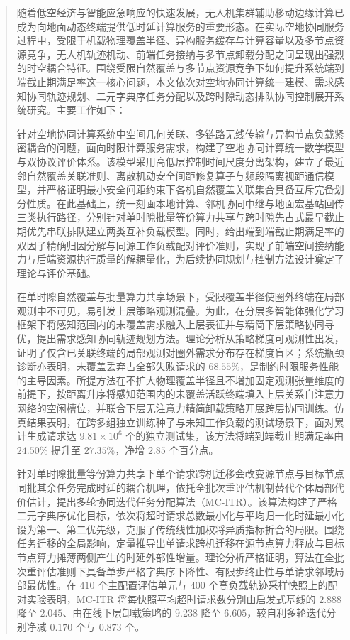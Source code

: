 
\begin{abstract}
随着低空经济与智能应急响应的快速发展，无人机集群辅助移动边缘计算已成为向地面动态终端提供低时延计算服务的重要形态。在实际空地协同服务过程中，受限于机载物理覆盖半径、异构服务缓存与计算容量以及多节点资源竞争，无人机轨迹机动、前端任务接纳与多节点卸载分配之间呈现出强烈的时空耦合特征。围绕受限自然覆盖与多节点资源竞争下如何提升系统端到端截止期满足率这一核心问题，本文依次对空地协同计算统一建模、需求感知协同轨迹规划、二元字典序任务分配以及跨时隙动态排队协同控制展开系统研究。主要工作如下：

针对空地协同计算系统中空间几何关联、多链路无线传输与异构节点负载紧密耦合的问题，面向时限计算服务需求，构建了空地协同计算统一数学模型与双协议评价体系。该模型采用高低层控制时间尺度分离架构，建立了最近邻自然覆盖关联准则、离散机动安全间距修复算子与频段隔离视距通信模型，并严格证明最小安全间距约束下各机自然覆盖关联集合具备互斥完备划分性质。在此基础上，统一刻画本地计算、邻机协同中继与地面宏基站回传三类执行路径，分别针对单时隙批量等份算力共享与跨时隙先占式最早截止期优先串联排队建立两类互补负载模型。同时，给出端到端截止期满足率的双因子精确归因分解与同源工作负载配对评价准则，实现了前端空间接纳能力与后端资源执行质量的解耦量化，为后续协同规划与控制方法设计奠定了理论与评价基础。

在单时隙自然覆盖与批量算力共享场景下，受限覆盖半径使圈外终端在局部观测中不可见，易引发上层策略观测混叠。为此，在分层多智能体强化学习框架下将感知范围内的未覆盖需求融入上层表征并与精简下层策略协同寻优，提出需求感知协同轨迹规划方法。理论分析从策略梯度可观测性出发，证明了仅含已关联终端的局部观测对圈外需求分布存在梯度盲区；系统瓶颈诊断亦表明，未覆盖丢弃占全部失败请求的 $68.55\%$，是制约时限服务性能的主导因素。所提方法在不扩大物理覆盖半径且不增加固定观测张量维度的前提下，按距离升序将感知范围内的未覆盖活跃终端填入上层关系自注意力网络的空闲槽位，并联合下层无注意力精简卸载策略开展跨层协同训练。仿真结果表明，在跨多组独立训练种子与未知工作负载的测试场景下，面对累计生成请求达 $9.81\times 10^6$ 个的独立测试集，该方法将端到端截止期满足率由 $24.50\%$ 提升至 $27.35\%$，净增 $2.85$ 个百分点。

针对单时隙批量等份算力共享下单个请求跨机迁移会改变源节点与目标节点同批其余任务完成时延的耦合机理，依托全批次重评估机制替代个体局部代价估计，提出多轮协同迭代任务分配算法（MC-ITR）。该算法构建了严格二元字典序优化目标，依次将超时请求总数最小化与平均归一化时延最小化设为第一、第二优先级，克服了传统线性加权将异质指标折合的局限。围绕任务迁移的全局影响，定量推导出单请求跨机迁移在源节点算力释放与目标节点算力摊薄两侧产生的时延外部性增量。理论分析严格证明，算法在全批次重评估准则下具备单步严格字典序下降性、有限步终止性与单请求邻域局部最优性。在 $410$ 个主配置评估单元与 $400$ 个高负载轨迹采样快照上的配对实验表明，MC-ITR 将每快照平均超时请求数分别由启发式基线的 $2.888$ 降至 $2.045$、由在线下层卸载策略的 $9.238$ 降至 $6.605$，较自利多轮迭代分别净减 $0.170$ 个与 $0.873$ 个。


\end{abstract}
